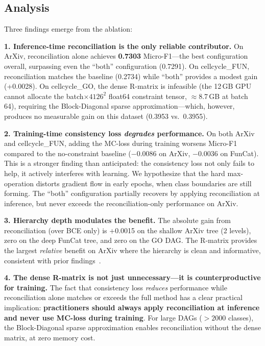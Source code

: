 \subsection{Analysis}

Three findings emerge from the ablation:

\textbf{1. Inference-time reconciliation is the only reliable contributor.}
On ArXiv, reconciliation alone achieves \textbf{0.7303} Micro-F1---the
best configuration overall, surpassing even the ``both'' configuration
(0.7291). On cellcycle\_FUN, reconciliation matches the baseline
(0.2734) while ``both'' provides a modest gain (+0.0028). On
cellcycle\_GO, the dense R-matrix is infeasible (the 12\,GB GPU cannot
allocate the batch$\times 4126^2$ float64 constraint tensor,
$\approx$8.7\,GB at batch 64), requiring the
Block-Diagonal sparse approximation---which, however, produces no
measurable gain on this dataset (0.3953 vs.\ 0.3955).

\textbf{2. Training-time consistency loss \emph{degrades} performance.}
On both ArXiv and cellcycle\_FUN, adding the MC-loss during training
worsens Micro-F1 compared to the no-constraint baseline ($-$0.0086 on
ArXiv, $-$0.0036 on FunCat). This is a stronger finding than
anticipated: the consistency loss not only fails to help, it actively
interferes with learning. We hypothesize that the hard max-operation
distorts gradient flow in early epochs, when class boundaries are still
forming. The ``both'' configuration partially recovers by applying
reconciliation at inference, but never exceeds the reconciliation-only
performance on ArXiv.

\textbf{3. Hierarchy depth modulates the benefit.}
The absolute gain from reconciliation (over BCE only) is +0.0015 on the
shallow ArXiv tree (2 levels), zero on the deep FunCat tree, and zero on
the GO DAG. The R-matrix provides the largest \emph{relative} benefit on
ArXiv where the hierarchy is clean and informative, consistent with
prior findings~\cite{sette2026hmctorch}.

\textbf{4. The dense R-matrix is not just unnecessary---it is
counterproductive for training.}  The fact that consistency loss
\emph{reduces} performance while reconciliation alone matches or exceeds
the full method has a clear practical implication: \textbf{practitioners
should always apply reconciliation at inference and never use MC-loss
during training}. For large DAGs ($>2000$ classes), the Block-Diagonal
sparse approximation enables reconciliation without the dense matrix, at
zero memory cost.
